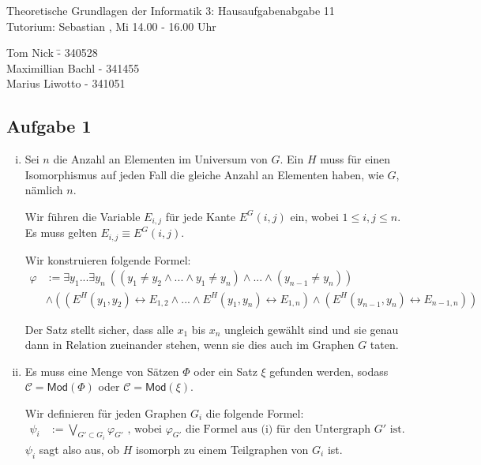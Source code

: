 \documentclass[a4paper,10pt]{article}
\begin{document}
\begin{center}
\Large{Theoretische Grundlagen der Informatik 3: Hausaufgabenabgabe 11} \\
\large{Tutorium: Sebastian , Mi 14.00 - 16.00 Uhr}
\end{center}
\begin{tabbing}
Tom Nick \hspace{2cm}\= - 340528\\
Maximillian Bachl \> - 341455 \\
Marius Liwotto\> -  341051
\end{tabbing}
\subsection*{Aufgabe 1}
\begin{enumerate}[(i)]
<<<<<<< HEAD
\item
Sei $n$ die Anzahl an Elementen im Universum von $G$. Ein $H$ muss für einen Isomorphismus auf jeden Fall die gleiche Anzahl an Elementen haben, wie $G$, nämlich $n$.

Wir führen die Variable $E_{i,j}$ für jede Kante $E^G(i,j)$ ein, wobei $1\le i,j \le n$. Es muss gelten $E_{i,j} \equiv E^G(i,j)$.

Wir konstruieren folgende Formel:
\begin{align*}
\varphi &:= \exists y_1 ... \exists y_n~ \left(\left(y_1 \neq y_2 \land ... \land  y_1 \neq y_n\right) \land ... \land \left(y_{n-1} \neq y_n\right)\right) \\
&\land \left(\left( E^H(y_1,y_2) \leftrightarrow E_{1,2} \land ... \land E^H(y_1,y_n) \leftrightarrow E_{1,n} \right) \land \left( E^H(y_{n-1},y_n) \leftrightarrow E_{n-1,n} \right) \right)
\end{align*}

Der Satz stellt sicher, dass alle $x_1$ bis $x_n$ ungleich gewählt sind und sie genau dann in Relation zueinander stehen, wenn sie dies auch im Graphen $G$ taten.
\item
Es muss eine Menge von Sätzen $\Phi$ oder ein Satz $\xi$ gefunden werden, sodass $\mathcal C = \textsf{Mod}(\Phi)$ oder $\mathcal C = \textsf{Mod}(\xi)$.

Wir definieren für jeden Graphen $G_i$ die folgende Formel:
\begin{align*}
\psi_i &:= \bigvee_{G' \subset G_i} \varphi_{G'} \text{ , wobei $\varphi_{G'}$ die Formel aus (i) für den Untergraph $G'$ ist.}
\end{align*}
$\psi_i$ sagt also aus, ob $H$ isomorph zu einem Teilgraphen von $G_i$ ist.


\end{enumerate}
\end{document}
